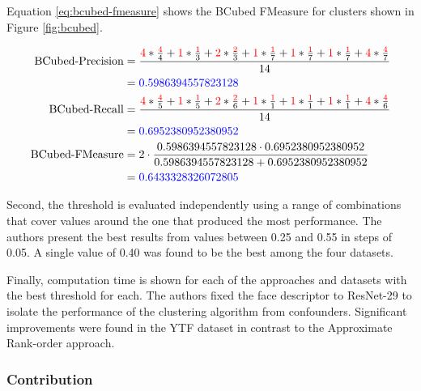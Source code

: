 \documentclass[]{article}
\begin{document}
Equation \ref{eq:bcubed-fmeasure} shows the BCubed FMeasure for clusters shown in Figure \ref{fig:bcubed}.

\small

\begin{equation}
\begin{aligned}
\text{BCubed-Precision} &= \frac{\textcolor{red}{4}*\frac{\textcolor{red}{4}}{4}+\textcolor{red}{1}*\frac{\textcolor{red}{1}}{3}+\textcolor{red}{2}*\frac{\textcolor{red}{2}}{3}+\textcolor{red}{1}*\frac{\textcolor{red}{1}}{7}+\textcolor{red}{1}*\frac{\textcolor{red}{1}}{7}+\textcolor{red}{1}*\frac{\textcolor{red}{1}}{7}+\textcolor{red}{4}*\frac{\textcolor{red}{4}}{7}}{14} \\
& = \textcolor{blue}{0.5986394557823128}\\
\text{BCubed-Recall} &= \frac{\textcolor{red}{4}*\frac{\textcolor{red}{4}}{5}+\textcolor{red}{1}*\frac{\textcolor{red}{1}}{5}+\textcolor{red}{2}*\frac{\textcolor{red}{2}}{6}+\textcolor{red}{1}*\frac{\textcolor{red}{1}}{1}+\textcolor{red}{1}*\frac{\textcolor{red}{1}}{1}+\textcolor{red}{1}*\frac{\textcolor{red}{1}}{1}+\textcolor{red}{4}*\frac{\textcolor{red}{4}}{6}}{14} \\
& = \textcolor{blue}{0.6952380952380952}\\
\text{BCubed-FMeasure} &= 2\cdot\frac{0.5986394557823128\cdot0.6952380952380952}{0.5986394557823128+0.6952380952380952}\\
& = \textcolor{blue}{0.6433328326072805}
\end{aligned}
\label{eq:bcubed-fmeasure}\end{equation}
\normalsize

Second, the threshold is evaluated independently using a range of combinations that cover values around the one that produced the most performance. The authors present the best results from values between 0.25 and 0.55 in steps of 0.05. A single value of 0.40 was found to be the best among the four datasets.

Finally, computation time is shown for each of the approaches and datasets with the best threshold for each. The authors fixed the face descriptor to ResNet-29 to isolate the performance of the clustering algorithm from confounders. Significant improvements were found in the YTF dataset in contrast to the Approximate Rank-order approach.

\hypertarget{contribution}{%
\subsubsection{Contribution}\label{contribution}}
\end{document}

